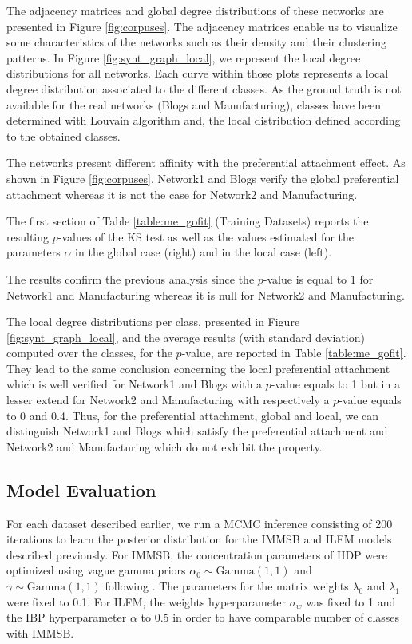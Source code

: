 The adjacency matrices and global degree distributions of these networks are presented in Figure \ref{fig:corpuses}. The adjacency matrices enable us to visualize some characteristics of the networks such as their density and their clustering patterns. In Figure \ref{fig:synt_graph_local}, we represent the local degree distributions for all networks. Each curve within those plots represents a local degree distribution associated to the different classes. As the ground truth is not available for the real networks (Blogs and Manufacturing), classes have been determined with Louvain algorithm \cite{Blondel2008} and, the local distribution defined according to the obtained classes. 

The networks present different affinity with the preferential attachment effect.  As shown in Figure \ref{fig:corpuses}, Network1 and Blogs verify the  global preferential attachment whereas it is not the case for Network2 and Manufacturing.

The first section of Table \ref{table:me_gofit} (Training Datasets) reports the resulting $p$-values of the KS test as well as the values estimated for the parameters $\alpha$ in the global case (right) and in the local case (left).

The results confirm the previous analysis since the $p$-value is equal to 1 for Network1 and Manufacturing whereas it is null for Network2 and Manufacturing.

The local degree distributions per class, presented in Figure \ref{fig:synt_graph_local}, and the average results (with standard deviation) computed over the classes, for the $p$-value, are reported in Table \ref{table:me_gofit}. They lead to the same conclusion concerning the local preferential attachment which is well verified for Network1 and Blogs with a $p$-value equals to 1 but in a lesser extend for Network2 and Manufacturing with respectively a $p$-value equals to 0 and 0.4. Thus, for the preferential attachment, global and local, we can distinguish Network1 and Blogs which satisfy the preferential attachment and Network2 and Manufacturing which do not exhibit the property.






\subsection{Model Evaluation}
For each dataset described earlier, we run a MCMC inference consisting of 200 iterations to learn the posterior distribution for the IMMSB and ILFM  models described previously. For IMMSB, the concentration parameters of HDP were optimized  using vague gamma priors $\alpha_0 \sim \text{Gamma}(1,1)$ and $\gamma \sim \text{Gamma}(1,1)$ following \cite{HDP}. The parameters for the matrix weights  $\lambda_0$ and $\lambda_1$ were fixed to 0.1. For ILFM, the weights hyperparameter  $\sigma_w$ was fixed to 1 and the IBP hyperparameter $\alpha$ to 0.5 in order to  have comparable number of classes with IMMSB.

